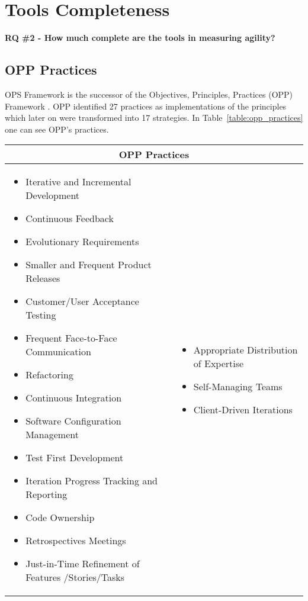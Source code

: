 \chapter{Tools Completeness}

\textbf{RQ \#2 - How much complete are the tools in measuring agility?}

\section{OPP Practices} %
OPS Framework is the successor of the Objectives, Principles, Practices (OPP) Framework \cite{opp}. OPP identified 27 practices as implementations of the principles which later on were transformed into 17 strategies. In Table~\ref{table:opp_practices} one can see OPP's practices.

\begin{tabular}{| p{7.5cm}  p{7.5cm} |}
	\hline
	\multicolumn{2}{|c|}{\textbf{OPP Practices}}  \\ \hline
     	\begin{itemize}
     		\item Iterative and Incremental Development 
     		\item Continuous Feedback 
     		\item Evolutionary Requirements 
     		\item Smaller and Frequent Product Releases 
     		\item Customer/User Acceptance Testing 
     		\item Frequent Face-to-Face Communication 
     		\item Refactoring 
			\item Continuous Integration
     		\item Software Configuration Management 
     		\item Test First Development 
     		\item Iteration Progress Tracking and Reporting 
     		\item Code Ownership 
     		\item Retrospectives Meetings 
     		\item Just-in-Time Refinement of Features /Stories/Tasks 
     	\end{itemize} 
     	& \begin{itemize}
     	 	\item Appropriate Distribution of Expertise
  			\item Self-Managing Teams 
     		\item Client-Driven Iterations 

\end{itemize}
\end{tabular}
